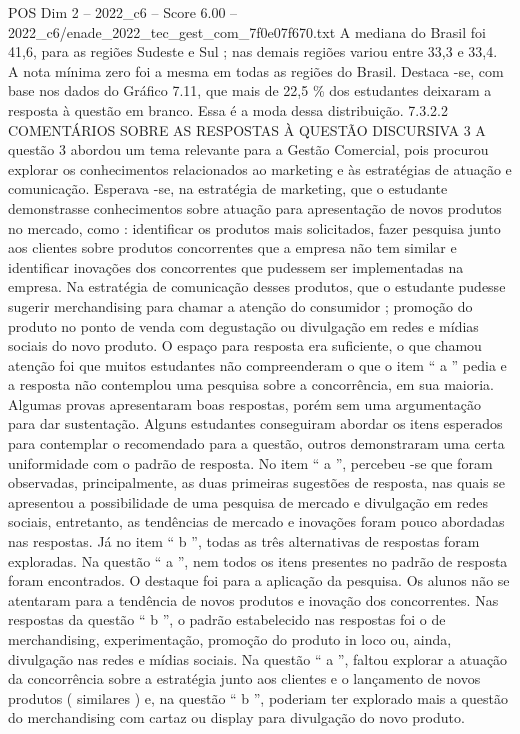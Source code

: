 \begin{textsample}{POS Dim 2 – 2022\_c6 – Score 6.00 – 2022\_c6/enade\_2022\_tec\_gest\_com\_7f0e07f670.txt}
A mediana do Brasil foi 41,6, para as regiões Sudeste e Sul ; nas demais regiões variou entre 33,3 e 33,4.
A nota mínima zero foi a mesma em todas as regiões do Brasil.
Destaca -se, com base nos dados do Gráfico 7.11, que mais de 22,5 \% dos estudantes deixaram a resposta à questão em branco.
Essa é a moda dessa distribuição. 7.3.2.2 COMENTÁRIOS SOBRE AS RESPOSTAS À QUESTÃO DISCURSIVA 3 A questão 3 abordou um tema relevante para a Gestão Comercial, pois procurou explorar os conhecimentos relacionados ao marketing e às estratégias de atuação e comunicação.
Esperava -se, na estratégia de marketing, que o estudante demonstrasse conhecimentos sobre atuação para apresentação de novos produtos no mercado, como : identificar os produtos mais solicitados, fazer pesquisa junto aos clientes sobre produtos concorrentes que a empresa não tem similar e identificar inovações dos concorrentes que pudessem ser implementadas na empresa.
Na estratégia de comunicação desses produtos, que o estudante pudesse sugerir merchandising para chamar a atenção do consumidor ; promoção do produto no ponto de venda com degustação ou divulgação em redes e mídias sociais do novo produto.
O espaço para resposta era suficiente, o que chamou atenção foi que muitos estudantes não compreenderam o que o item “ a ” pedia e a resposta não contemplou uma pesquisa sobre a concorrência, em sua maioria.
Algumas provas apresentaram boas respostas, porém sem uma argumentação para dar sustentação.
Alguns estudantes conseguiram abordar os itens esperados para contemplar o recomendado para a questão, outros demonstraram uma certa uniformidade com o padrão de resposta.
No item “ a ”, percebeu -se que foram observadas, principalmente, as duas primeiras sugestões de resposta, nas quais se apresentou a possibilidade de uma pesquisa de mercado e divulgação em redes sociais, entretanto, as tendências de mercado e inovações foram pouco abordadas nas respostas.
Já no item “ b ”, todas as três alternativas de respostas foram exploradas.
Na questão “ a ”, nem todos os itens presentes no padrão de resposta foram encontrados.
O destaque foi para a aplicação da pesquisa.
Os alunos não se atentaram para a tendência de novos produtos e inovação dos concorrentes.
Nas respostas da questão “ b ”, o padrão estabelecido nas respostas foi o de merchandising, experimentação, promoção do produto in loco ou, ainda, divulgação nas redes e mídias sociais.
Na questão “ a ”, faltou explorar a atuação da concorrência sobre a estratégia junto aos clientes e o lançamento de novos produtos ( similares ) e, na questão “ b ”, poderiam ter explorado mais a questão do merchandising com cartaz ou display para divulgação do novo produto.

\end{textsample}
